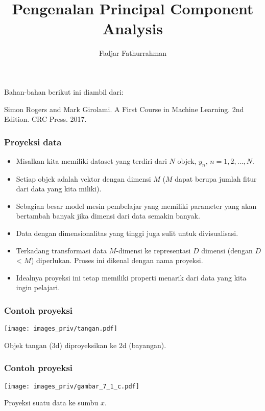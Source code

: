 \documentclass[bahasa,11pt,aspectratio=169]{beamer}
\begin{document}
\title{Pengenalan Principal Component Analysis}
\author{Fadjar Fathurrahman}
\date{} %

\frame{\titlepage}


\begin{frame}

Bahan-bahan berikut ini diambil dari:

Simon Rogers and Mark Girolami. A First Course in Machine Learning. 2nd Edition.
CRC Press. 2017.

\end{frame}

\begin{frame}
\frametitle{Proyeksi data}

\begin{itemize}
\item Misalkan kita memiliki dataset yang terdiri dari $N$ objek, $y_{n}$, $n=1,2,\ldots,N$.
%
\item Setiap objek adalah vektor dengan dimensi $M$ ($M$ dapat berupa jumlah fitur dari
data yang kita miliki).
%
\item Sebagian besar model mesin pembelajar yang memiliki parameter yang akan
bertambah banyak jika dimensi dari data semakin banyak.
%
\item Data dengan dimensionalitas yang tinggi juga sulit untuk divisualisasi.
%
\item Terkadang transformasi data $M$-dimensi ke representasi $D$ dimensi (dengan $D$ < $M$)
diperlukan. Proses ini dikenal dengan nama proyeksi.
%
\item Idealnya proyeksi ini tetap memiliki properti menarik dari data yang kita
ingin pelajari.
\end{itemize}

\end{frame}




\begin{frame}[fragile]
\frametitle{Contoh proyeksi}

\begin{center}
\texttt{[image: images\_priv/tangan.pdf]}
\end{center}

Objek tangan (3d) diproyeksikan ke 2d (bayangan).

\end{frame}


\begin{frame}[fragile]
\frametitle{Contoh proyeksi}

\begin{center}
\texttt{[image: images\_priv/gambar\_7\_1\_c.pdf]}
\end{center}

Proyeksi suatu data ke sumbu $x$.

\end{frame}
\end{document}
